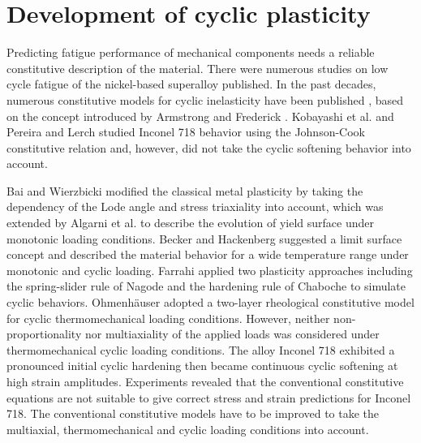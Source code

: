 \section{Development of cyclic plasticity}
\noindent
Predicting fatigue performance of mechanical components needs a reliable constitutive description of the material. There were numerous studies on low cycle fatigue of the nickel-based superalloy published. In the past decades, numerous constitutive models for cyclic inelasticity have been published \cite{ohno1993kinematic, Pun2014138, AbdelKarim2000225, Kang2004299}, based on the concept introduced by Armstrong and Frederick \cite{armstrong1966mathematical}. Kobayashi et al. \cite{Kobayashi2008389} and Pereira and Lerch \cite{Pereira2001715} studied Inconel 718 behavior using the Johnson-Cook constitutive relation and, however, did not take the cyclic softening behavior into account. 


Bai and Wierzbicki \cite{Bai20081071} modified the classical metal plasticity by taking the dependency of the Lode angle and stress triaxiality into account, which was extended by Algarni et al. \cite{Algarni2015140} to describe the evolution of yield surface under monotonic loading conditions. Becker and Hackenberg \cite{Becker2011596} suggested a limit surface concept and described the material behavior for a wide temperature range under monotonic and cyclic loading.
Farrahi \cite{Farrahi2014245} applied two plasticity approaches including the spring-slider rule of Nagode and the hardening rule of Chaboche to simulate cyclic behaviors.
Ohmenh\"{a}user \cite{Ohmenhauser2014631} adopted a two-layer rheological constitutive model for cyclic thermomechanical loading conditions.
However, neither non-proportionality nor multiaxiality of the applied loads was considered under thermomechanical cyclic loading conditions.
The alloy Inconel 718 exhibited a pronounced initial cyclic hardening then became continuous cyclic softening at high strain amplitudes. Experiments revealed that the conventional constitutive equations are not suitable to give correct stress and strain predictions for Inconel 718. The conventional constitutive models have to be improved to take the multiaxial, thermomechanical and cyclic loading conditions into account.


